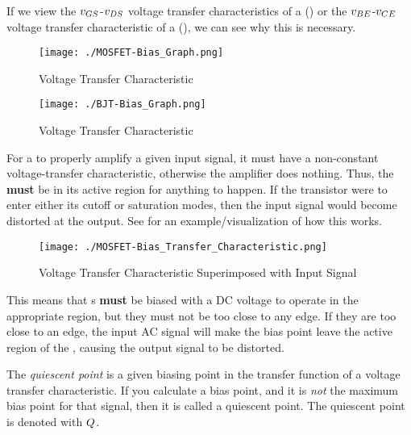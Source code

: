 If we view the $\ACVoltage{\Gate\Source}$-$\ACVoltage{\Drain\Source}$ voltage transfer characteristics of a  () or the $\ACVoltage{\Base\Emitter}$-$\ACVoltage{\Collector\Emitter}$ voltage transfer characteristic of a  (), we can see why this is necessary.

\begin{figure}[h!tbp]
  \centering
  \texttt{[image: ./MOSFET-Bias\_Graph.png]}
  \caption{ Voltage Transfer Characteristic}
  \label{fig:MOSFET-Bias_Graph}
\end{figure}

\begin{figure}[h!tbp]
  \centering
  \texttt{[image: ./BJT-Bias\_Graph.png]}
  \caption{ Voltage Transfer Characteristic}
  \label{fig:BJT-Bias_Graph}
\end{figure}

For a  to properly amplify a given input signal, it must have a non-constant voltage-transfer characteristic, otherwise the amplifier does nothing.
Thus, the  \textbf{must} be in its active region for anything to happen.
If the transistor were to enter either its cutoff or saturation modes, then the input signal would become distorted at the output.
See  for an example/visualization of how this works.

\begin{figure}[h!tbp]
  \centering
  \texttt{[image: ./MOSFET-Bias\_Transfer\_Characteristic.png]}
  \caption[ Transfer Graph]{ Voltage Transfer Characteristic Superimposed with Input Signal}
  \label{fig:MOSFET-Bias_Transfer_Characteristic}
\end{figure}

This means that s \textbf{must} be biased with a DC voltage to operate in the appropriate region, but they must not be too close to any edge.
If they are too close to an edge, the input AC signal will make the bias point leave the active region of the , causing the output signal to be distorted.

\begin{definition}\label{def:Quiescent_Point}
  The \emph{quiescent point} is a given biasing point in the transfer function of a voltage transfer characteristic.
  If you calculate a bias point, and it is \emph{not} the maximum bias point for that signal, then it is called a quiescent point.
  The quiescent point is denoted with $Q$.
\end{definition}

